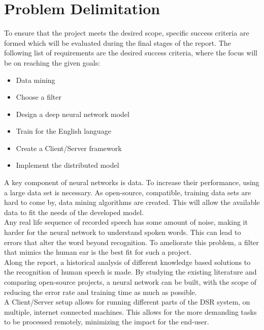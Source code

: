 


\section{Problem Delimitation}
To ensure that the project meets the desired scope,
specific success criteria are formed which will be
evaluated during the final stages of the report.
The following list of requirements are the desired
success criteria, where the focus will be on reaching
the given goals:

\begin{itemize}
	\item Data mining
	\item Choose a filter
	\item Design a deep neural network model
	\item Train for the English language
	\item Create a Client/Server framework
	\item Implement the distributed model
\end{itemize}

A key component of neural networks is data. To increase their performance, using a large data set is necessary. As open-source, compatible, training data sets are hard to come by, data mining algorithms are created. This will allow the available data to fit the needs of the developed model.\\

Any real life sequence of recorded speech has some amount of noise, making it harder for the neural network to understand spoken words.
This can lead to errors that alter the word beyond recognition. 
To ameliorate this problem, a filter that mimics the human
ear is the best fit for such a project.\\

Along the report, a historical analysis of different knowledge
based solutions to the recognition of human speech is made.
By studying the existing literature and comparing open-source projects, a neural network can be built, with the scope of reducing the error rate and training time as much
as possible.\\

A Client/Server setup allows for running different parts of the DSR system, on multiple, internet connected machines. This allows for the more demanding tasks to be processed remotely, minimizing the impact for the end-user.
